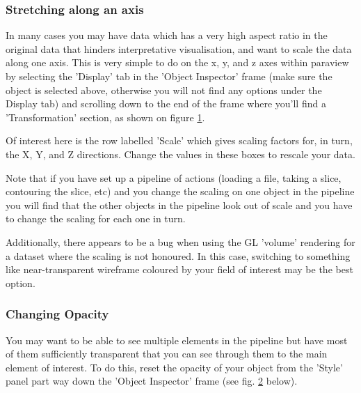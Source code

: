 \subsubsection{Stretching along an axis}

In many cases you may have data which has a very high aspect ratio in the original data that hinders interpretative visualisation, and want to scale the data along one axis. This is very simple to do on the x, y, and z axes within paraview by selecting the 'Display' tab in the 'Object Inspector' frame (make sure the object is selected above, otherwise you will not find any options under the Display tab) and scrolling down to the end of the frame where you'll find a 'Transformation' section, as shown on figure \ref{paraview8}.

\begin{figure}[h!]
\label{paraview8}
  \centering
\end{figure}

Of interest here is the row labelled 'Scale' which gives scaling factors for, in turn, the X, Y, and Z directions. Change the values in these boxes to rescale your data.

Note that if you have set up a pipeline of actions (loading a file, taking a slice, contouring the slice, etc) and you change the scaling on one object in the pipeline you will find that the other objects in the pipeline look out of scale and you have to change the scaling for each one in turn.

Additionally, there appears to be a bug when using the GL 'volume' rendering for a dataset where the scaling is not honoured. In this case, switching to something like near-transparent wireframe coloured by your field of interest may be the best option. 

\subsubsection{Changing Opacity}

You may want to be able to see multiple elements in the pipeline but have most of them sufficiently transparent that you can see through them to the main element of interest. To do this, reset the opacity of your object from the 'Style' panel part way down the 'Object Inspector' frame (see fig. \ref{paraview9} below).

\begin{figure}[h!]
\label{paraview9}
  \centering
\end{figure}

